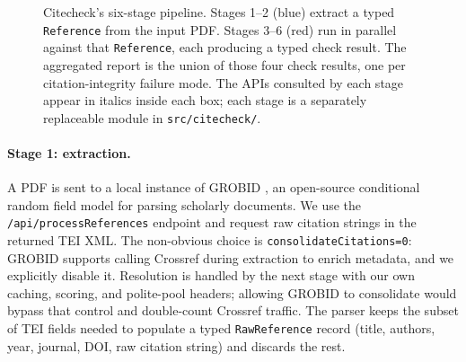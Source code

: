 \documentclass[12pt]{article}
\begin{document}
\begin{figure}[htbp]
\caption{Citecheck's six-stage pipeline. Stages 1--2 (blue) extract a typed \texttt{Reference} from the input PDF. Stages 3--6 (red) run in parallel against that \texttt{Reference}, each producing a typed check result. The aggregated report is the union of those four check results, one per citation-integrity failure mode. The APIs consulted by each stage appear in italics inside each box; each stage is a separately replaceable module in \texttt{src/citecheck/}.}
\label{fig:pipeline}
\end{figure}

\paragraph{Stage 1: extraction.} A PDF is sent to a local instance of GROBID \citep{grobid}, an open-source conditional random field model for parsing scholarly documents. We use the \texttt{/api/processReferences} endpoint and request raw citation strings in the returned TEI XML. The non-obvious choice is \texttt{consolidateCitations=0}: GROBID supports calling Crossref during extraction to enrich metadata, and we explicitly disable it. Resolution is handled by the next stage with our own caching, scoring, and polite-pool headers; allowing GROBID to consolidate would bypass that control and double-count Crossref traffic. The parser keeps the subset of TEI fields needed to populate a typed \texttt{RawReference} record (title, authors, year, journal, DOI, raw citation string) and discards the rest.
\end{document}
